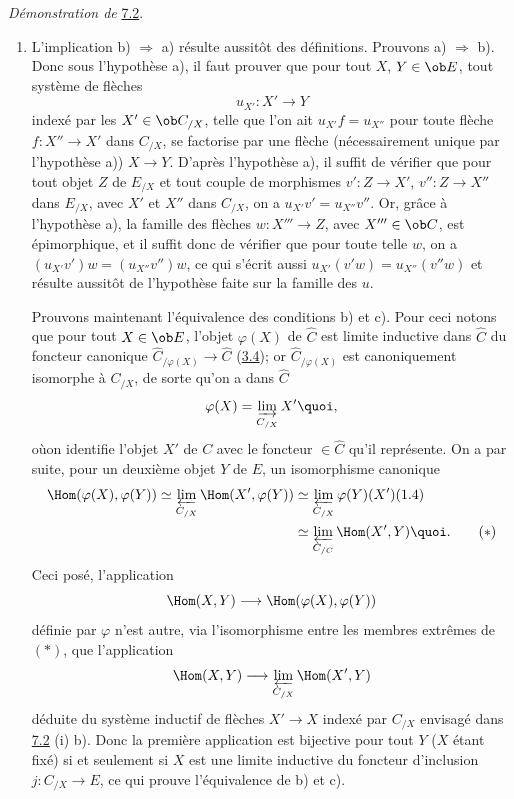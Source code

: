 \medskip
\noindent \emph{Démonstration de} \hyperref[I.prop7.2]{7.2}.
\begin{enumerate}
\renewcommand{\theenumi}{\roman{enumi}}
\renewcommand{\labelenumi}{(\theenumi)}
\item L'implication b) $\Rightarrow$ a) résulte aussitôt des
  définitions. Prouvons a) $\Rightarrow$ b). Donc sous
  l'hypothèse a), il faut prouver que pour tout $X$, $Y\in \ob E$,
  tout système de flèches
$$
u_{X'}:X'\longrightarrow Y
$$
indexé par les $X'\in \ob C_{/X}$, telle que l'on ait
$u_{X'}f=u_{X''}$ pour toute flèche $f:X''\rightarrow X'$ dans
$C_{/X}$, se factorise par une flèche (nécessairement unique par
l'hypothèse a)) $X\rightarrow Y$. D'après l'hypothèse a), il suffit
de vérifier que pour tout objet $Z$ de $E_{/X}$ et tout couple de
morphismes $v':Z\rightarrow X'$, $v'':Z\rightarrow X''$ dans
$E_{/X}$, avec $X'$ et $X''$ dans $C_{/X}$, on a
$u_{X'}v'=u_{X''}v''$. Or, grâce à l'hypothèse a), la famille des
flèches $w:X'''\rightarrow Z$, avec $X'''\in \ob C$, est
épimorphique, et il suffit donc de vérifier que pour toute telle
$w$, on a $(u_{X'}v')w=(u_{X''}v'')w$, ce qui s'écrit aussi
$u_{X'}(v'w)=u_{X''}(v''w)$ et résulte aussitôt de l'hypothèse faite
sur la famille des $u$.

Prouvons maintenant l'équivalence des conditions b) et c). Pour ceci
notons que pour tout $X\in \ob E$, l'objet $\varphi(X)$ de
$\widehat{C}$ est limite inductive dans $\widehat{C}$ du foncteur
canonique $\widehat{C}_{/\varphi(X)}\rightarrow \widehat{C}$ (\hyperref[I.prop3.4]{3.4});
or $\widehat{C}_{/\varphi(X)}$ est canoniquement isomorphe à
$C_{/X}$, de sorte qu'on a dans $\widehat{C}$
$$
\varphi(X)=\varinjlim_{C_{/X}}X'{\quoi},
$$
où\pageoriginale on identifie l'objet $X'$ de $C$ avec le foncteur
$\in \widehat{C}$ qu'il représente. On a par suite, pour un deuxième
objet $Y$ de $E$, un isomorphisme canonique
\begin{align*}
\Hom(\varphi(X),\varphi(Y))\simeq\varprojlim_{C_{/X}}
\Hom(X',\varphi(Y))&\simeq
\varprojlim_{C_{/X}}\varphi(Y)(X')(1.4)\\
&\simeq \varprojlim_{C_{/C}} \Hom(X'%
,Y){\quoi}.\tag{$\ast$}
\end{align*}
Ceci posé, l'application
$$
\Hom(X,Y)\longrightarrow \Hom(\varphi(X),\varphi(Y))
$$
définie par $\varphi$ n'est autre, via l'isomorphisme entre les
membres extrêmes de $(\ast)$, que l'application
$$
\Hom(X,Y)\longrightarrow \varprojlim_{C_{/X}} \Hom(X',Y)
$$
déduite du système inductif de flèches $X'\rightarrow X$ indexé par
$C_{/X}$ envisagé dans \hyperref[I.prop7.2]{7.2} (i) b). Donc la première
application est bijective pour tout $Y$ ($X$ étant fixé) si et
seulement si $X$ est une limite inductive du foncteur d'inclusion
$j:C_{/X}\rightarrow E$, ce qui prouve l'équivalence de b) et c).


\end{enumerate}
